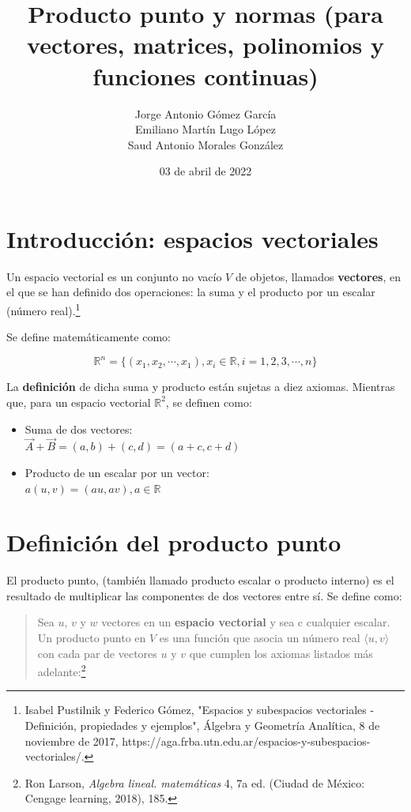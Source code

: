 \documentclass{article}
\title{Producto punto y normas (para vectores, matrices, polinomios y funciones continuas)}
\author{
    Jorge Antonio Gómez García \\
    Emiliano Martín Lugo López \\
    Saud Antonio Morales González}
\date{03 de abril de 2022}
\begin{document}
\maketitle

\section{Introducción: espacios vectoriales}

    Un espacio vectorial es un conjunto no vacío $V$ de objetos, llamados \textbf{vectores}, en el que se han definido dos operaciones: la suma y el producto por un escalar (número real).\footnote{Isabel Pustilnik y Federico Gómez, "Espacios y subespacios vectoriales - Definición, propiedades y ejemplos", Álgebra y Geometría Analítica, 8 de noviembre de 2017, https://aga.frba.utn.edu.ar/espacios-y-subespacios-vectoriales/.}

    Se define matemáticamente como:

    \begin{equation*}
        \mathbb{R}^n=\{ (x_1, x_2, \dotsb, x_1), x_i \in \mathbb{R}, i=1,2,3,\dotsb,n \}
    \end{equation*}

    La \textbf{definición} de dicha suma y producto están sujetas a diez axiomas. Mientras que, para un espacio vectorial $\mathbb{R}^2$, se definen como:
    \begin{itemize}
        \item Suma de dos vectores: \\
            $ {\vec{A} + \vec{B}= (a,b) + (c,d) = (a+c, c+d)} $
                
        \item Producto de un escalar por un vector: \\
            $ {a(u, v) = (au, av), a \in \mathbb{R}} $
                
    \end{itemize}

\section{Definición del producto punto}

    El producto punto, (también llamado producto escalar o producto interno) es el resultado de multiplicar las componentes de dos vectores entre sí. Se define como:

    \begin{quote}
        Sea $u$, $v$ y $w$ vectores en un \textbf{espacio vectorial} y sea c cualquier escalar. Un producto punto en $V$ es una función que asocia un número real $\langle u, v\rangle$ con cada par de vectores $u$ y $v$ que cumplen los axiomas listados más adelante:\footnote{Ron Larson, \textit{Algebra lineal. matemáticas} 4, 7a ed. (Ciudad de México: Cengage learning, 2018), 185.}
    \end{quote}
\end{document}
